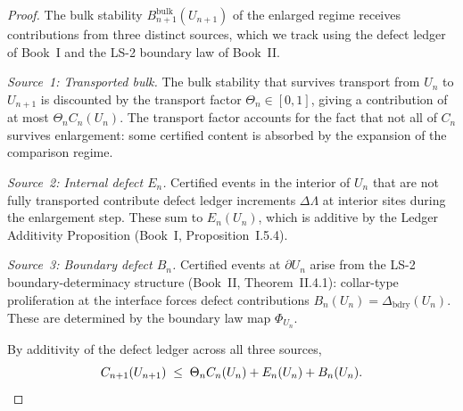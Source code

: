 \documentclass[12pt,oneside]{amsbook}
\theoremstyle{plain}
\theoremstyle{definition}
\theoremstyle{remark}
\begin{document}
\begin{proof}
The bulk stability $B_{n+1}^{\mathrm{bulk}}(U_{n+1})$ of the enlarged
regime receives contributions from three distinct sources, which we
track using the defect ledger of Book~I and the LS-2 boundary law of
Book~II.

\emph{Source~1: Transported bulk.}  The bulk stability that survives
transport from $U_n$ to $U_{n+1}$ is discounted by the transport
factor $\Theta_n \in [0,1]$, giving a contribution of at most
$\Theta_n C_n(U_n)$.  The transport factor accounts for the fact that
not all of $C_n$ survives enlargement: some certified content is
absorbed by the expansion of the comparison regime.

\emph{Source~2: Internal defect $E_n$.}  Certified events in the
interior of $U_n$ that are not fully transported contribute defect
ledger increments $\Delta\Lambda$ at interior sites during the
enlargement step.  These sum to $E_n(U_n)$, which is additive by the
Ledger Additivity Proposition (Book~I, Proposition~I.5.4).

\emph{Source~3: Boundary defect $B_n$.}  Certified events at
$\partial U_n$ arise from the LS-2 boundary-determinacy structure
(Book~II, Theorem~II.4.1): collar-type proliferation at the interface
forces defect contributions $B_n(U_n) = \Delta_{\mathrm{bdry}}(U_n)$.
These are determined by the boundary law map $\Phi_{U_n}$.

By additivity of the defect ledger across all three sources,
\[
  C_{n+1}(U_{n+1})
  \;\leq\;
  \Theta_n C_n(U_n) + E_n(U_n) + B_n(U_n). \qedhere
\]
\end{proof}
\end{document}
